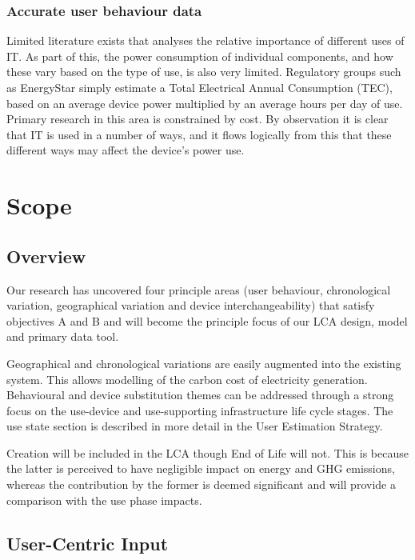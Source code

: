\documentclass[conference]{IEEEtran}
\begin{document}
\subsubsection{Accurate user behaviour data}

Limited literature exists that analyses the relative importance of
different uses of IT. As part of this, the power consumption of
individual components, and how these vary based on the type of use, is
also very limited. Regulatory groups such as EnergyStar simply
estimate a Total Electrical Annual Consumption (TEC), based on an
average device power multiplied by an average hours per day of
use. Primary research in this area is constrained by cost. By
observation it is clear that IT is used in a number of ways, and it
flows logically from this that these different ways may affect the
device’s power use.


\section{Scope}

\subsection{Overview}

Our research has uncovered four principle areas (user behaviour,
chronological variation, geographical variation and device
interchangeability) that satisfy objectives A and B and will become
the principle focus of our LCA design, model and primary data
tool.

Geographical and chronological variations are easily augmented into
the existing system. This allows modelling of the carbon cost of
electricity generation. Behavioural and device substitution themes can
be addressed through a strong focus on the use-device and
use-supporting infrastructure life cycle stages. The use state section
is described in more detail in the User Estimation Strategy.

Creation will be included in the LCA though End of Life will not. This
is because the latter is perceived to have negligible impact on energy
and GHG emissions, whereas the contribution by the former is deemed
significant and will provide a comparison with the use phase impacts.

\subsection{User-Centric Input}
\end{document}
